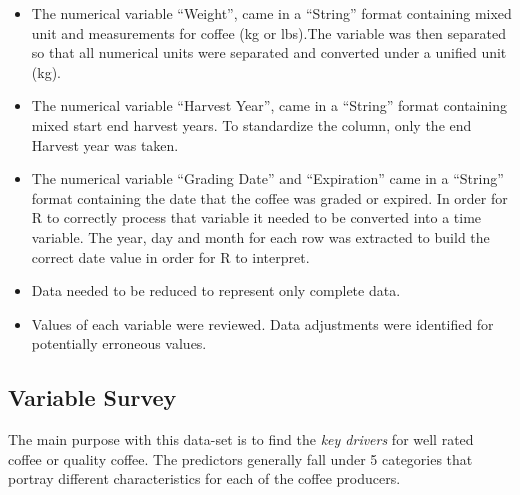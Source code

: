 \documentclass[
  12pt,
  english,
  man]{apa6}
\begin{document}
\begin{itemize}
\item
  The numerical variable \enquote{Weight}, came in a \enquote{String} format containing mixed unit and measurements for coffee (kg or lbs).The variable was then separated so that all numerical units were separated and converted under a unified unit (kg).
\item
  The numerical variable \enquote{Harvest Year}, came in a \enquote{String} format containing mixed start \textbar{} end harvest years. To standardize the column, only the end Harvest year was taken.
\item
  The numerical variable \enquote{Grading Date} and \enquote{Expiration} came in a \enquote{String} format containing the date that the coffee was graded or expired. In order for R to correctly process that variable it needed to be converted into a time variable. The year, day and month for each row was extracted to build the correct date value in order for R to interpret.
\item
  Data needed to be reduced to represent only complete data.
\item
  Values of each variable were reviewed. Data adjustments were identified for potentially erroneous values.
\end{itemize}

\hypertarget{variable-survey}{%
\subsection{Variable Survey}\label{variable-survey}}

The main purpose with this data-set is to find the \emph{key drivers} for well rated coffee or quality coffee. The predictors generally fall under 5 categories that portray different characteristics for each of the coffee producers.
\end{document}
